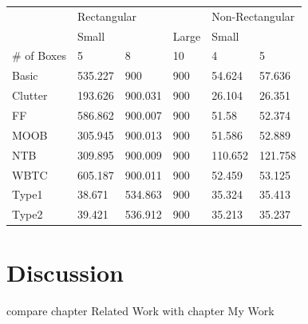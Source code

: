 \documentclass[12pt,a4paper,oneside]{report}
\begin{document}
\begin{table}[]
\begin{tabular}{l|l|l|l|l|l|}
\cline{2-6}
                              & \multicolumn{3}{l|}{Rectangular}         & \multicolumn{2}{l|}{Non-Rectangular} \\ \cline{2-6} 
                              & \multicolumn{2}{l|}{Small} & Large & \multicolumn{2}{l|}{Small}       \\ \hline
\multicolumn{1}{|l|}{\# of Boxes} & 5            & 8           & 10    & 4            & 5            \\ \hline
\multicolumn{1}{|l|}{Basic}   & 535.227      & 900         & 900   & 54.624       & 57.636       \\ \hline
\multicolumn{1}{|l|}{Clutter} & 193.626      & 900.031     & 900   & 26.104       & 26.351       \\ \hline
\multicolumn{1}{|l|}{FF}      & 586.862      & 900.007     & 900   & 51.58        & 52.374       \\ \hline
\multicolumn{1}{|l|}{MOOB}    & 305.945      & 900.013     & 900   & 51.586       & 52.889       \\ \hline
\multicolumn{1}{|l|}{NTB}     & 309.895      & 900.009     & 900   & 110.652      & 121.758      \\ \hline
\multicolumn{1}{|l|}{WBTC}    & 605.187      & 900.011     & 900   & 52.459       & 53.125       \\ \hline
\multicolumn{1}{|l|}{Type1}   & 38.671       & 534.863     & 900   & 35.324       & 35.413       \\ \hline
\multicolumn{1}{|l|}{Type2}   & 39.421       & 536.912     & 900   & 35.213       & 35.237       \\ \hline
\end{tabular}
\end{table}
\chapter{Discussion}
compare chapter Related Work with chapter My Work \cite{LifschitzASP}
\end{document}
